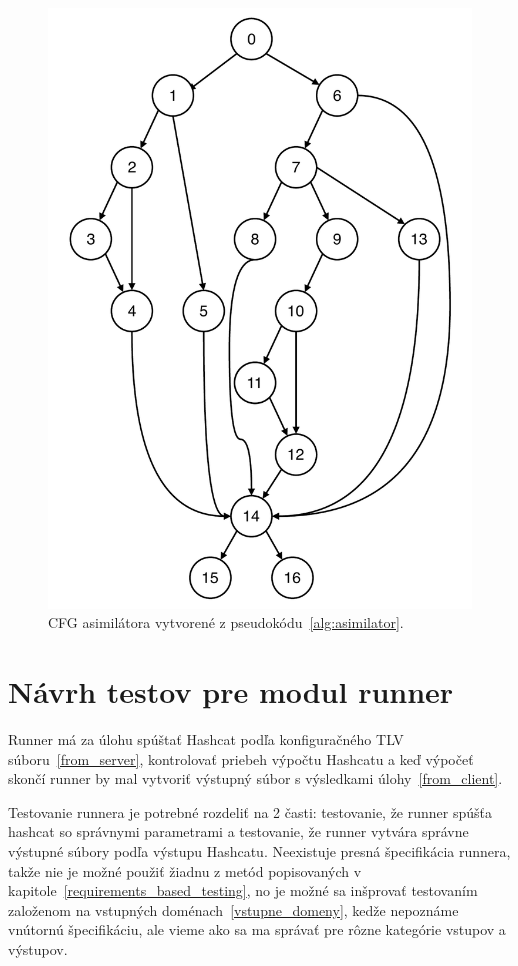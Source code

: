\begin{figure}[h]
	\centering
	\includegraphics[height=0.7\paperheight]{obrazky/cfg_asimilator.pdf}
	\caption{CFG asimilátora vytvorené z pseudokódu~\ref{alg:asimilator}.}
	\label{fig:cfg_asim}
\end{figure}


\section{Návrh testov pre modul runner}
Runner má za úlohu spúštať Hashcat podľa konfiguračného TLV súboru~\ref{from_server}, kontrolovať priebeh výpočtu Hashcatu a keď výpočeť skončí runner by mal vytvoriť výstupný súbor s výsledkami úlohy~\ref{from_client}.

Testovanie runnera je potrebné rozdeliť na 2 časti: testovanie, že runner spúšťa hashcat so správnymi parametrami a testovanie, že runner vytvára správne výstupné súbory podľa výstupu Hashcatu.
Neexistuje presná špecifikácia runnera, takže nie je možné použiť žiadnu z metód popisovaných v kapitole~\ref{requirements_based_testing}, no je možné sa inšprovať testovaním založenom na vstupných doménach~\ref{vstupne_domeny}, kedže nepoznáme vnútornú špecifikáciu, ale vieme ako sa ma správať pre rôzne kategórie vstupov a výstupov.


